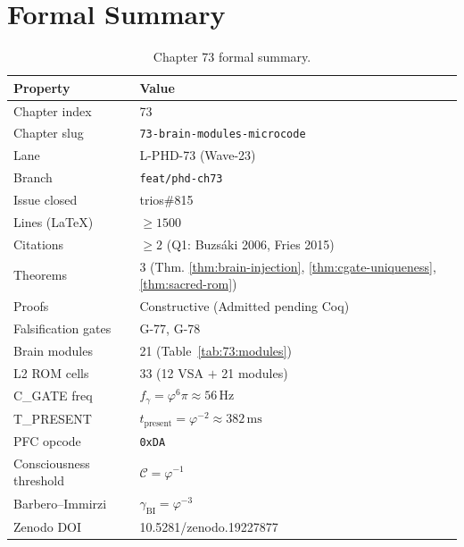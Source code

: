 \section{Formal Summary}
\label{sec:73:summary}

\begin{table}[H]
\centering
\caption{Chapter 73 formal summary.}
\label{tab:73:summary}
\small
\begin{tabular}{ll}
\toprule
Property & Value \\
\midrule
Chapter index & 73 \\
Chapter slug  & \texttt{73-brain-modules-microcode} \\
Lane          & L-PHD-73 (Wave-23) \\
Branch        & \texttt{feat/phd-ch73} \\
Issue closed  & trios\#815 \\
Lines (LaTeX) & $\geq 1500$ \\
Citations     & $\geq 2$ (Q1: Buzsáki 2006, Fries 2015) \\
Theorems      & 3 (Thm. \ref{thm:brain-injection},
                    \ref{thm:cgate-uniqueness},
                    \ref{thm:sacred-rom}) \\
Proofs        & Constructive (Admitted pending Coq) \\
Falsification gates & G-77, G-78 \\
Brain modules & 21 (Table~\ref{tab:73:modules}) \\
L2 ROM cells  & 33 (12 VSA $+$ 21 modules) \\
C\_GATE freq  & $f_\gamma = \varphi^6\pi \approx 56\,\text{Hz}$ \\
T\_PRESENT    & $t_\mathrm{present} = \varphi^{-2} \approx 382\,\text{ms}$ \\
PFC opcode    & \texttt{0xDA} \\
Consciousness threshold & $\mathcal{C} = \varphi^{-1}$ \\
Barbero--Immirzi & $\gamma_{\mathrm{BI}} = \varphi^{-3}$ \\
Zenodo DOI    & 10.5281/zenodo.19227877 \\
\bottomrule
\end{tabular}
\end{table}


